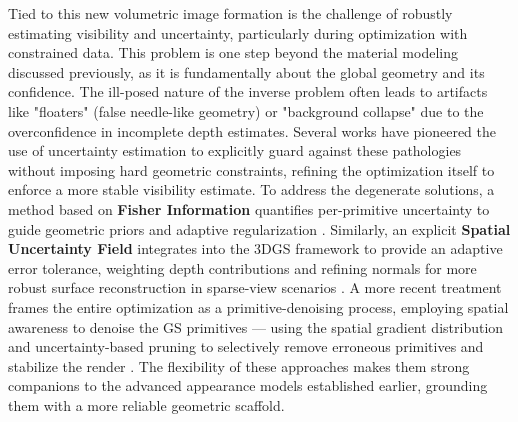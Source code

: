 \documentclass[11pt,a4paper]{article}
\begin{document}
Tied to this new volumetric image formation is the challenge of robustly estimating visibility and uncertainty, particularly during optimization with constrained data. This problem is one step beyond the material modeling discussed previously, as it is fundamentally about the global geometry and its confidence. The ill-posed nature of the inverse problem often leads to artifacts like "floaters" (false needle-like geometry) or "background collapse" due to the overconfidence in incomplete depth estimates. Several works have pioneered the use of uncertainty estimation to explicitly guard against these pathologies without imposing hard geometric constraints, refining the optimization itself to enforce a more stable visibility estimate. To address the degenerate solutions, a method based on \textbf{Fisher Information} quantifies per-primitive uncertainty to guide geometric priors and adaptive regularization \cite{arxiv:2606.20842v1}. Similarly, an explicit \textbf{Spatial Uncertainty Field} integrates into the 3DGS framework to provide an adaptive error tolerance, weighting depth contributions and refining normals for more robust surface reconstruction in sparse-view scenarios \cite{arxiv:2503.11172v1}. A more recent treatment frames the entire optimization as a primitive-denoising process, employing spatial awareness to denoise the GS primitives --- using the spatial gradient distribution and uncertainty-based pruning to selectively remove erroneous primitives and stabilize the render \cite{arxiv:2605.14880v1}. The flexibility of these approaches makes them strong companions to the advanced appearance models established earlier, grounding them with a more reliable geometric scaffold.
\end{document}
